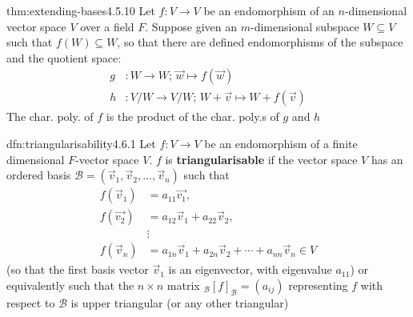 \documentclass[landscape, 8pt]{extarticle}
\begin{document}
\begin{multicols}{3}
\vspace{-5pt}
\begin{thm}{thm:extending-bases}{4.5.10}
    Let $f : V\to V$ be an endomorphism of an $n$-dimensional vector space $V$ over a field $F$. Suppose given an $m$-dimensional subspace $W\subseteq V$ such that $f(W)\subseteq W$, so that there are defined endomorphisms of the subspace and the quotient space:
    \begin{align*}
        g &: W \to W;\, \vec{w}\mapsto f(\vec{w})\\
        h &: V / W \to V / W;\, W + \vec{v} \mapsto W + f(\vec{v})
    \end{align*}
    The char. poly. of $f$ is the product of the char. poly.s of $g$ and $h$
\end{thm}

\begin{dfn}[Triangularisability]{dfn:triangularisability}{4.6.1}
    Let $f : V \to V$ be an endomorphism of a finite dimensional $F$-vector space $V$. $f$ is \textbf{triangularisable} if the vector space $V$ has an ordered basis $\mathcal{B} = (\vec{v}_{1}, \vec{v}_{2},\dots,\vec{v}_{n})$ such that
        \begin{align*}
            f(\vec{v}_{1}) &= a_{11}\vec{v_{1}}, \\
            f(\vec{v_{2}}) &= a_{12}\vec{v}_{1} + a_{22}\vec{v}_{2}, \\
            &\vdots \\
            f(\vec{v}_{n}) &= a_{1n}\vec{v}_{1} + a_{2n}\vec{v}_{2} + \cdots + a_{nn}\vec{v}_{n}\in V
        \end{align*}
        (so that the first basis vector $\vec{v}_{1}$ is an eigenvector, with eigenvalue $a_{11}$) or equivalently such that the $n \times n$ matrix $_{\mathcal{B}}[f]_{\mathcal{B}} = (a_{ij})$ representing $f$ with respect to $\mathcal{B}$ is upper triangular (or any other triangular)
\end{dfn}



\end{multicols}
\end{document}
